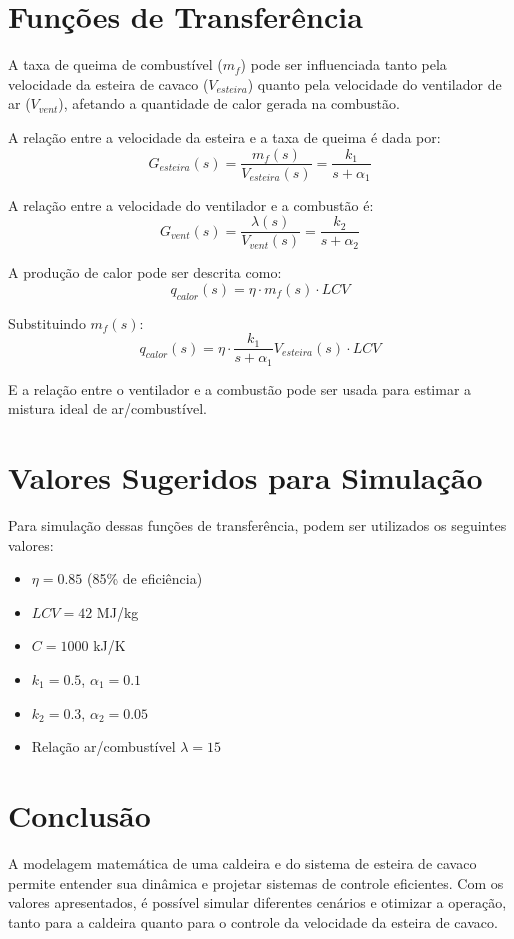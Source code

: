 \documentclass{article}
\begin{document}
\section{Fun\c{c}\~oes de Transfer\^encia}
A taxa de queima de combust\'ivel ($m_f$) pode ser influenciada tanto pela velocidade da esteira de cavaco ($V_{esteira}$) quanto pela velocidade do ventilador de ar ($V_{vent}$), afetando a quantidade de calor gerada na combust\~ao.

A rela\c{c}\~ao entre a velocidade da esteira e a taxa de queima \'e dada por:
\begin{equation}
    G_{esteira}(s) = \frac{m_f(s)}{V_{esteira}(s)} = \frac{k_1}{s + \alpha_1}
\end{equation}

A rela\c{c}\~ao entre a velocidade do ventilador e a combust\~ao \'e:
\begin{equation}
    G_{vent}(s) = \frac{\lambda(s)}{V_{vent}(s)} = \frac{k_2}{s + \alpha_2}
\end{equation}

A produ\c{c}\~ao de calor pode ser descrita como:
\begin{equation}
    q_{calor}(s) = \eta \cdot m_f(s) \cdot LCV
\end{equation}

Substituindo $m_f(s)$:
\begin{equation}
    q_{calor}(s) = \eta \cdot \frac{k_1}{s + \alpha_1} V_{esteira}(s) \cdot LCV
\end{equation}

E a rela\c{c}\~ao entre o ventilador e a combust\~ao pode ser usada para estimar a mistura ideal de ar/combust\'ivel.

\section{Valores Sugeridos para Simula\c{c}\~ao}
Para simula\c{c}\~ao dessas fun\c{c}\~oes de transfer\^encia, podem ser utilizados os seguintes valores:
\begin{itemize}
    \item $\eta = 0.85$ (85\% de efici\^encia)
    \item $LCV = 42$ MJ/kg
    \item $C = 1000$ kJ/K
    \item $k_1 = 0.5$, $\alpha_1 = 0.1$
    \item $k_2 = 0.3$, $\alpha_2 = 0.05$
    \item Rela\c{c}\~ao ar/combust\'ivel $\lambda = 15$
\end{itemize}

\section{Conclus\~ao}
A modelagem matemática de uma caldeira e do sistema de esteira de cavaco permite entender sua dinâmica e projetar sistemas de controle eficientes. Com os valores apresentados, é possível simular diferentes cenários e otimizar a operação, tanto para a caldeira quanto para o controle da velocidade da esteira de cavaco.
\end{document}
